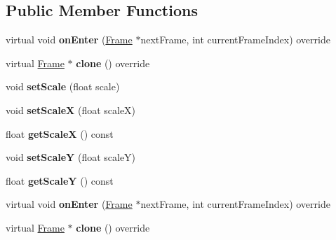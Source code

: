 \subsection*{Public Member Functions}
\begin{DoxyCompactItemize}
\item 
\mbox{\label{classScaleFrame_a4021397372c97cc7eac0ff649da3a2a0}} 
virtual void {\bfseries on\+Enter} (\hyperlink{classFrame}{Frame} $\ast$next\+Frame, int current\+Frame\+Index) override
\item 
\mbox{\label{classScaleFrame_ade91166af09fccdd2aa0ab94f26b68d3}} 
virtual \hyperlink{classFrame}{Frame} $\ast$ {\bfseries clone} () override
\item 
\mbox{\label{classScaleFrame_a664c42c6d3a1a007d7d5544e6beca52c}} 
void {\bfseries set\+Scale} (float scale)
\item 
\mbox{\label{classScaleFrame_a103be1c0e5367efeef09d2c4d0b4b7ed}} 
void {\bfseries set\+ScaleX} (float scaleX)
\item 
\mbox{\label{classScaleFrame_a8cced6ff4cc53c05f483d14aa464b6ed}} 
float {\bfseries get\+ScaleX} () const
\item 
\mbox{\label{classScaleFrame_ac85bfc171c453388261b6bd994ad1e97}} 
void {\bfseries set\+ScaleY} (float scaleY)
\item 
\mbox{\label{classScaleFrame_a713f4226711b0ba167c9bde2038977e5}} 
float {\bfseries get\+ScaleY} () const
\item 
\mbox{\label{classScaleFrame_a41533f3a1593deb6fb44a7e65ef988e9}} 
virtual void {\bfseries on\+Enter} (\hyperlink{classFrame}{Frame} $\ast$next\+Frame, int current\+Frame\+Index) override
\item 
\mbox{\label{classScaleFrame_a75648957249a6453858d6cf41bf69052}} 
virtual \hyperlink{classFrame}{Frame} $\ast$ {\bfseries clone} () override
\item 
\mbox{\label{classScaleFrame_a664c42c6d3a1a007d7d5544e6beca52c}} 

\end{DoxyCompactItemize}
